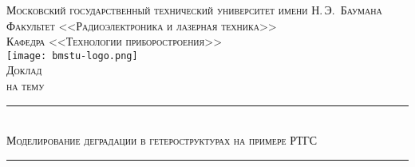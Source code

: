 \newcommand{\HRule}{\rule{\linewidth}{.5mm}\\}

\begin{center}

\textsc{\large Московский государственный технический университет имени Н.\,Э.~Баумана}\\[5mm]
\textsc{Факультет <<Радиоэлектроника и лазерная техника>>}\\
\textsc{Кафедра <<Технологии приборостроения>>}\\[2.5mm]

\texttt{[image: bmstu-logo.png]}\\[0.5cm]

\textsc{\large Доклад}\\
\textsc{на тему}

\HRule[0.5cm]
{\huge \textsc{Моделирование деградации в гетероструктурах на примере РТГС}}
\HRule

\vfill



\end{center}

\newpage
{}






